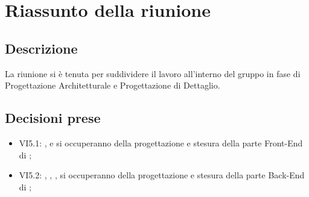 \section{Riassunto della riunione}
\subsection{Descrizione}

La riunione si è tenuta per suddividere il lavoro all'interno del gruppo in fase di Progettazione Architetturale e Progettazione di Dettaglio. 

\subsection{Decisioni prese}
\begin{itemize}
\item VI5.1: \GR, \SM e \AF si occuperanno della progettazione e stesura della parte Front-End di \progetto;
\item VI5.2: \GN, \FB, \MP, \MV si occuperanno della progettazione e stesura della parte Back-End di \progetto;
\end{itemize}
